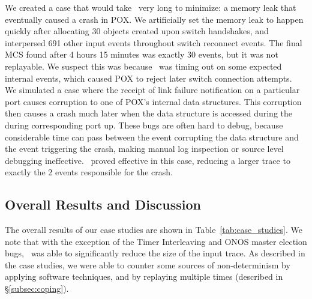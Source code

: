 We created a case that would take \projectname~very long to minimize: a
memory leak that eventually caused a crash in POX. We artificially set the
memory leak to happen quickly after allocating 30 objects created upon switch
handshakes, and interpersed 691 other input events throughout switch reconnect
events. The final MCS found after 4 hours 15 minutes was exactly 30 events, but it
was not replayable. We suspect this was because \projectname~was timing out on
some expected internal events, which caused POX to reject later switch
connection attempts.\\[0.5ex]
%
We simulated a case where the receipt of
link failure notification on a particular port causes corruption to one of
POX's internal data
structures. This corruption then causes a crash much later when the data structure is
accessed during the during corresponding port up. These bugs
are often hard to debug, because considerable time can pass between the event
corrupting the data structure and the event triggering the crash, making
manual log inspection or source level debugging ineffective.
\projectname~proved effective in this case, reducing a larger trace to
exactly the 2 events responsible for the crash.

\subsection{Overall Results and Discussion}

The overall results of our case studies are shown in
Table~\ref{tab:case_studies}. We note that with the exception of the Timer
Interleaving and ONOS master election bugs, \projectname~was able to significantly reduce the size of the
input trace. As described in the case studies, we were able to
counter some sources of non-determinism by applying software techniques,
and by replaying multiple times (described in \S\ref{subsec:coping}).



